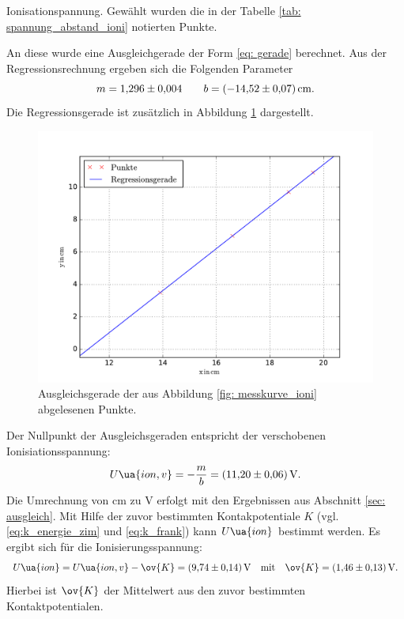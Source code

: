 Ionisationspannung.
Gewählt wurden die in der Tabelle \ref{tab: spannung_abstand_ioni} notierten Punkte.

An diese wurde eine Ausgleichgerade der Form \eqref{eq: gerade} berechnet.
Aus der Regressionsrechnung ergeben sich die Folgenden Parameter
\begin{equation*}
  m=\num{1.296\pm0.004} \qquad b=\SI{-14.52\pm0.07}{\centi\meter}.
\end{equation*}
Die Regressionsgerade ist zusätzlich in Abbildung \ref{fig: ioni_fit} dargestellt.
\begin{figure}
  \centering
  \includegraphics[width=0.8 \textwidth]{../Messdaten/gerade_io_final.pdf}
  \caption{Ausgleichsgerade der aus Abbildung \ref{fig: messkurve_ioni} abgelesenen Punkte.}
  \label{fig: ioni_fit}
\end{figure}
Der Nullpunkt der Ausgleichsgeraden entspricht der verschobenen
Ionisiationsspannung:
\begin{equation*}
  U\ua{ion,v}=-\frac{m}{b}=\SI{11.20\pm0.06}{\volt}.
\end{equation*}
Die Umrechnung von $\si{\centi\meter}$ zu $\si{\volt}$ erfolgt mit den Ergebnissen aus
Abschnitt \ref{sec: ausgleich}.
Mit Hilfe der zuvor bestimmten Kontakpotentiale $K$ (vgl. \eqref{eq:k_energie_zim} und \eqref{eq:k_frank})
kann $U\ua{ion}$ bestimmt werden. Es ergibt sich für die Ionisierungsspannung:
\begin{equation}
  \label{eq: u_ion}
  U\ua{ion}= U\ua{ion,v}-\ov{K}=\SI{9.74\pm0.14}{\volt} \quad \text{mit} \quad \ov{K}=\SI{1.46\pm0.13}{\volt}.
\end{equation}
Hierbei ist $\ov{K}$ der Mittelwert aus den zuvor bestimmten Kontaktpotentialen. %
\FloatBarrier
